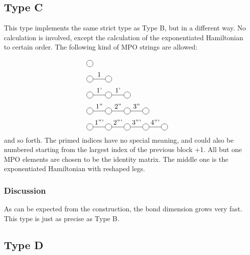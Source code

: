 \subsection{Type C}

This type implements the same strict type as Type B, but in a different way. No calculation is involved, except the calculation of the exponentiated Hamiltonian to certain order. The following kind of \Gls{MPO} strings are allowed:

\begin{equation}
    \begin{split}
        &\mpob{1}{ {,}  }{}{}{}{{,,}} \\
        &\mpob{2}{ {,"1",}  }{}{}{}{{,,}}\\
        &\mpob{3}{ {,"1'","1'",}  }{}{}{}{{,,,}}\\
        &\mpob{4}{ {,"1''","2''","3''",}  }{}{}{}{{,,,,,}}\\
        &\mpob{5}{ {,"1'''","2'''","3'''","4'''",}  }{}{}{}{{,,,,,}}\\
    \end{split}
\end{equation}
and so forth. The primed indices have no special meaning, and could also be numbered starting from the largest index of the previous block +1. All but one \Gls{MPO} elements are chosen to be the identity matrix. The middle one is the exponentiated Hamiltonian with reshaped legs.

\subsubsection{Discussion}
As can be expected from the construction, the bond dimension grows very fast. This type is just as precise as Type B.

\subsection{Type D}

\def \rhs{\expH{2}{ $L_{n}^{-1}  M_{2n+2}  R_{n}^{-1}$ }{}{}{{"n","n"}}  }

